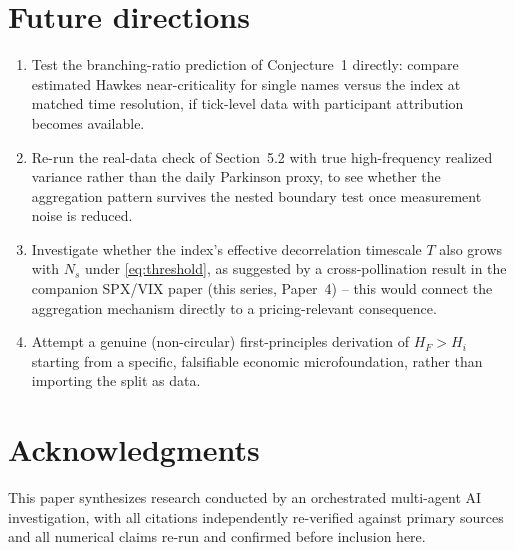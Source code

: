 \documentclass[11pt]{article}
\begin{document}
\section{Future directions}

\begin{enumerate}
\item Test the branching-ratio prediction of Conjecture~1 directly: compare estimated Hawkes near-criticality for single names versus the index at matched time resolution, if tick-level data with participant attribution becomes available.
\item Re-run the real-data check of Section~5.2 with true high-frequency realized variance rather than the daily Parkinson proxy, to see whether the aggregation pattern survives the nested boundary test once measurement noise is reduced.
\item Investigate whether the index's effective decorrelation timescale $T$ also grows with $N_s$ under \eqref{eq:threshold}, as suggested by a cross-pollination result in the companion SPX/VIX paper (this series, Paper~4) -- this would connect the aggregation mechanism directly to a pricing-relevant consequence.
\item Attempt a genuine (non-circular) first-principles derivation of $H_F>H_i$ starting from a specific, falsifiable economic microfoundation, rather than importing the split as data.
\end{enumerate}

\section*{Acknowledgments}
This paper synthesizes research conducted by an orchestrated multi-agent AI investigation, with all citations independently re-verified against primary sources and all numerical claims re-run and confirmed before inclusion here.
\end{document}
